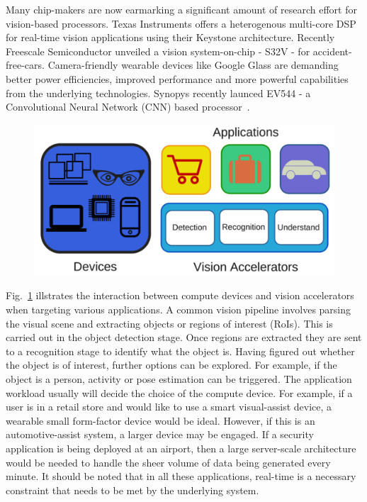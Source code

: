 
Many chip-makers are now earmarking a significant amount of research effort for 
vision-based processors. Texas Instruments offers a heterogenous multi-core DSP for real-time vision applications using their Keystone architecture. 
Recently Freescale Semiconductor unveiled a vision system-on-chip - S32V - for accident-free-cars. Camera-friendly wearable devices like Google Glass are 
demanding better power efficiencies, improved performance and more powerful capabilities from the underlying technologies. Synopys recently launced 
EV544 - a Convolutional Neural Network (CNN) based processor~\cite{syncnn}.

\begin{figure}[!htb]
\vspace{0pt}
\centering
\includegraphics[width=0.9\linewidth]{./figures/vision_apps_devices.png}
\vspace{0pt}
\caption{}
\label{fig:iot}
\vspace{0pt}
\end{figure}

Fig.~\ref{fig:iot} illstrates the interaction between compute devices and vision accelerators when targeting various applications. A common vision pipeline involves parsing the visual scene and extracting objects or regions of interest (RoIs). This is 
carried out in the object detection stage. Once regions are extracted they are sent to a recognition stage to identify 
what the object is. Having figured out whether the object is of interest, further options can be explored. For example, if the 
object is a person, activity or pose estimation can be triggered. The application workload usually will decide the choice of 
the compute device. For example, if a user is in a retail store and would like to use a smart visual-assist device, a 
wearable small form-factor device would be ideal. However, if this is an automotive-assist system, a larger device may be 
engaged. If a security application is being deployed at an airport, then a large server-scale architecture would be needed to
handle the sheer volume of data being generated every minute. It should be noted that in all these applications, real-time is a necessary constraint that needs to be met by the underlying system.

